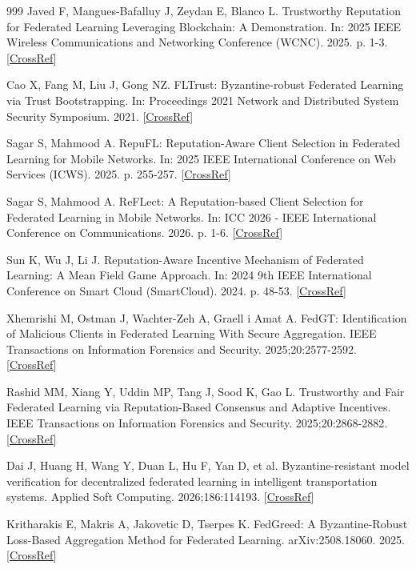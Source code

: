 \documentclass[cmc,article,submit,moreauthors,pdftex]{Definitions/tsp}
\begin{document}
\begin{thebibliography}{999}
Javed F, Mangues-Bafalluy J, Zeydan E, Blanco L. Trustworthy Reputation for Federated Learning Leveraging Blockchain: A Demonstration. In: 2025 IEEE Wireless Communications and Networking Conference (WCNC). 2025. p. 1-3. [\href{https://doi.org/10.1109/wcnc61545.2025.10978588}{CrossRef}]

Cao X, Fang M, Liu J, Gong NZ. FLTrust: Byzantine-robust Federated Learning via Trust Bootstrapping. In: Proceedings 2021 Network and Distributed System Security Symposium. 2021. [\href{https://doi.org/10.14722/ndss.2021.24434}{CrossRef}]

Sagar S, Mahmood A. RepuFL: Reputation-Aware Client Selection in Federated Learning for Mobile Networks. In: 2025 IEEE International Conference on Web Services (ICWS). 2025. p. 255-257. [\href{https://doi.org/10.1109/icws67624.2025.00039}{CrossRef}]

Sagar S, Mahmood A. ReFLect: A Reputation-based Client Selection for Federated Learning in Mobile Networks. In: ICC 2026 - IEEE International Conference on Communications. 2026. p. 1-6. [\href{https://doi.org/10.1109/icc59461.2026.11586954}{CrossRef}]

Sun K, Wu J, Li J. Reputation-Aware Incentive Mechanism of Federated Learning: A Mean Field Game Approach. In: 2024 9th IEEE International Conference on Smart Cloud (SmartCloud). 2024. p. 48-53. [\href{https://doi.org/10.1109/smartcloud62736.2024.00016}{CrossRef}]

Xhemrishi M, Ostman J, Wachter-Zeh A, Graell i Amat A. FedGT: Identification of Malicious Clients in Federated Learning With Secure Aggregation. IEEE Transactions on Information Forensics and Security. 2025;20:2577-2592. [\href{https://doi.org/10.1109/TIFS.2025.3539964}{CrossRef}]

Rashid MM, Xiang Y, Uddin MP, Tang J, Sood K, Gao L. Trustworthy and Fair Federated Learning via Reputation-Based Consensus and Adaptive Incentives. IEEE Transactions on Information Forensics and Security. 2025;20:2868-2882. [\href{https://doi.org/10.1109/TIFS.2025.3546841}{CrossRef}]

Dai J, Huang H, Wang Y, Duan L, Hu F, Yan D, et al. Byzantine-resistant model verification for decentralized federated learning in intelligent transportation systems. Applied Soft Computing. 2026;186:114193. [\href{https://doi.org/10.1016/j.asoc.2025.114193}{CrossRef}]

Kritharakis E, Makris A, Jakovetic D, Tserpes K. FedGreed: A Byzantine-Robust Loss-Based Aggregation Method for Federated Learning. arXiv:2508.18060. 2025. [\href{https://doi.org/10.48550/arXiv.2508.18060}{CrossRef}]


\end{thebibliography}
\end{document}
